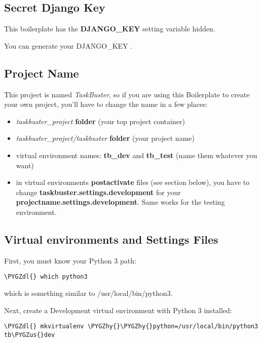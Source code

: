 \documentclass[letterpaper,10pt,english]{sphinxmanual}
\def\PYGZus{\char`\_}
\def\PYGZdl{\char`\$}
\def\PYGZhy{\char`\-}
\begin{document}
\subsection{Secret Django Key}
\label{quick_start:secret-django-key}
This boilerplate has the \textbf{DJANGO\_KEY} setting variable hidden.

You can generate your DJANGO\_KEY .


\subsection{Project Name}
\label{quick_start:project-name}
This project is named \emph{TaskBuster}, so if you are using this
Boilerplate to create your own project, you'll have to change
the name in a few places:
\begin{itemize}
\item {} 
\emph{taskbuster\_project} \textbf{folder} (your top project container)

\item {} 
\emph{taskbuster\_project/taskbuster} \textbf{folder} (your project name)

\item {} 
virtual environment names: \textbf{tb\_dev} and \textbf{tb\_test} (name them whatever you want)

\item {} 
in virtual environments \textbf{postactivate} files (see section below), you have to change \textbf{taskbuster.settings.development} for your \textbf{projectname.settings.development}. Same works for the testing environment.

\end{itemize}


\subsection{Virtual environments and Settings Files}
\label{quick_start:virtual-environments-and-settings-files}
First, you must know your Python 3 path:

\begin{Verbatim}[commandchars=\\\{\}]
\PYGZdl{} which python3
\end{Verbatim}

which is something similar to /usr/local/bin/python3.

Next, create a Development virtual environment with Python 3 installed:

\begin{Verbatim}[commandchars=\\\{\}]
\PYGZdl{} mkvirtualenv \PYGZhy{}\PYGZhy{}python=/usr/local/bin/python3 tb\PYGZus{}dev
\end{Verbatim}
\end{document}
